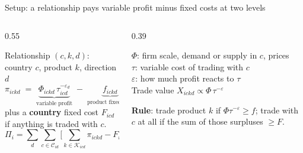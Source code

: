 \documentclass[11pt,aspectratio=169,notes]{beamer}
\begin{document}
\begin{frame}{Setup: a relationship pays variable profit minus fixed costs at two levels}
\vspace{0.15cm}
\begin{columns}[T]
\begin{column}{0.55\textwidth}
\begin{mathbox}
Relationship $(c,k,d)$: country $c$, product $k$, direction $d$
\[
\pi_{ickd} \;=\; \underbrace{\Phi_{ickd}\,\tau_{icd}^{-\varepsilon_d}}_{\text{variable profit}} \;-\; \underbrace{f_{ickd}}_{\text{product fixed cost}}
\]
plus a \textbf{country} fixed cost $F_{icd}$ if anything is traded with $c$.
\[
\Pi_i=\sum_{d}\sum_{c\in\mathcal C_{id}}\Big[\sum_{k\in\mathcal K_{icd}}\pi_{ickd}-F_{icd}\Big]
\]
\end{mathbox}
\end{column}
\begin{column}{0.39\textwidth}
\begin{wordsbox}
$\Phi$: firm scale, demand or supply in $c$, prices\\[0.2em]
$\tau$: variable cost of trading with $c$\\[0.2em]
$\varepsilon$: how much profit reacts to $\tau$\\[0.2em]
Trade value $X_{ickd}\propto\Phi\,\tau^{-\varepsilon}$
\end{wordsbox}
\vspace{0.15cm}
{\small\textbf{Rule}: trade product $k$ if $\Phi\tau^{-\varepsilon}\ge f$; trade with $c$ at all if the sum of those surpluses $\ge F$.}
\end{column}
\end{columns}
\end{frame}
\end{document}
